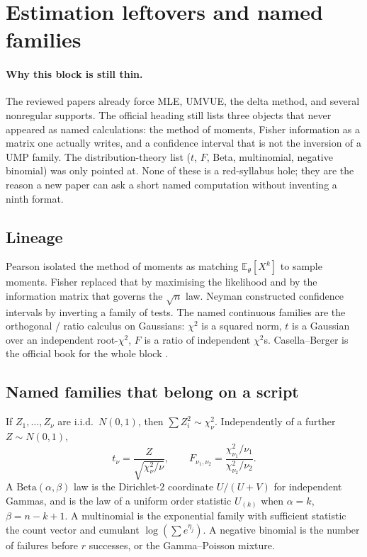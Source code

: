 \section{Estimation leftovers and named families}
\label{sec:est}

\paragraph{Why this block is still thin.}
The reviewed papers already force MLE, UMVUE, the delta method, and several nonregular supports. The official heading still lists three objects that never appeared as named calculations: the method of moments, Fisher information as a matrix one actually writes, and a confidence interval that is not the inversion of a UMP family. The distribution-theory list (\(t\), \(F\), Beta, multinomial, negative binomial) was only pointed at. None of these is a red-syllabus hole; they are the reason a new paper can ask a short named computation without inventing a ninth format.

\subsection{Lineage}

Pearson isolated the method of moments as matching \(\mathbb{E}_{\theta}[X^{k}]\) to sample moments. Fisher replaced that by maximising the likelihood and by the information matrix that governs the \(\sqrt{n}\) law. Neyman constructed confidence intervals by inverting a family of tests. The named continuous families are the orthogonal / ratio calculus on Gaussians: \(\chi^{2}\) is a squared norm, \(t\) is a Gaussian over an independent root-\(\chi^{2}\), \(F\) is a ratio of independent \(\chi^{2}\)s. Casella--Berger is the official book for the whole block \cite{casella02}.

\subsection{Named families that belong on a script}

\begin{definition}
\label{def:named}
If \(Z_{1},\ldots,Z_{\nu}\) are i.i.d.\ \(N(0,1)\), then \(\sum Z_{i}^{2}\sim\chi^{2}_{\nu}\). Independently of a further \(Z\sim N(0,1)\),
\[
t_{\nu}
=
\frac{Z}{\sqrt{\chi^{2}_{\nu}/\nu}},
\qquad
F_{\nu_{1},\nu_{2}}
=
\frac{\chi^{2}_{\nu_{1}}/\nu_{1}}{\chi^{2}_{\nu_{2}}/\nu_{2}}.
\]
A \(\mathrm{Beta}(\alpha,\beta)\) law is the Dirichlet-\(2\) coordinate \(U/(U+V)\) for independent Gammas, and is the law of a uniform order statistic \(U_{(k)}\) when \(\alpha=k\), \(\beta=n-k+1\). A multinomial is the exponential family with sufficient statistic the count vector and cumulant \(\log(\sum e^{\eta_{j}})\). A negative binomial is the number of failures before \(r\) successes, or the Gamma--Poisson mixture.
\end{definition}

